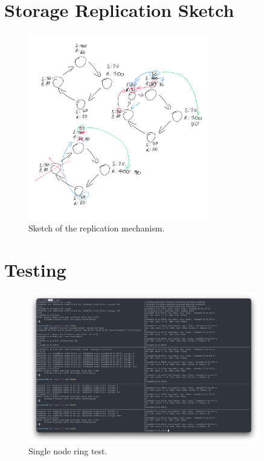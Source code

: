 \documentclass[a4paper, 11pt]{article}
\begin{document}
\section{Storage Replication Sketch}
\begin{figure}[H]
  \centering
  \includegraphics[width=0.7\textwidth]{screenshots/sketch.PNG}
  \caption{Sketch of the replication mechanism.}
  \label{fig:replication-sketch}
\end{figure}

\section{Testing}

\begin{figure}[H]
  \centering
  \includegraphics[width=0.9\textwidth]{screenshots/single.png}
  \caption{Single node ring test.}
  \label{fig:test1}
\end{figure}
\end{document}
